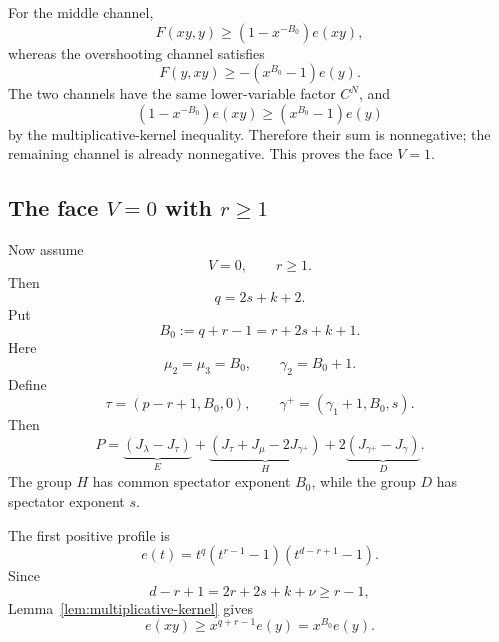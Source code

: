 \documentclass[11pt]{article}
\theoremstyle{definition}
\begin{document}
For the middle channel,
\begin{equation*}
F(xy,y)
\ge
(1-x^{-B_0})e(xy),
\end{equation*}
whereas the overshooting channel satisfies
\begin{equation*}
F(y,xy)
\ge
-(x^{B_0}-1)e(y).
\end{equation*}
The two channels have the same lower-variable factor \(C^N\), and
\begin{equation*}
(1-x^{-B_0})e(xy)
\ge
(x^{B_0}-1)e(y)
\end{equation*}
by the multiplicative-kernel inequality.  Therefore their sum is nonnegative; the remaining channel is already nonnegative.  This proves the face \(V=1\).

\subsection{The face \texorpdfstring{\(V=0\)}{V = 0} with \texorpdfstring{\(r\ge1\)}{r >= 1}}

Now assume
\begin{equation*}
V=0,
\qquad
r\ge1.
\end{equation*}
Then
\begin{equation*}
q=2s+k+2.
\end{equation*}
Put
\begin{equation*}
B_0:=q+r-1=r+2s+k+1.
\end{equation*}
Here
\begin{equation*}
\mu_2=\mu_3=B_0,
\qquad
\gamma_2=B_0+1.
\end{equation*}
Define
\begin{equation*}
\tau=(p-r+1,B_0,0),
\qquad
\gamma^+=(\gamma_1+1,B_0,s).
\end{equation*}
Then
\begin{equation*}
P
=
\underbrace{(J_\lambda-J_\tau)}_{E}
+
\underbrace{(J_\tau+J_\mu-2J_{\gamma^+})}_{H}
+
2\underbrace{(J_{\gamma^+}-J_\gamma)}_{D}.
\end{equation*}
The group \(H\) has common spectator exponent \(B_0\), while the group \(D\) has spectator exponent \(s\).

The first positive profile is
\begin{equation*}
e(t)
=
t^q(t^{r-1}-1)(t^{d-r+1}-1).
\end{equation*}
Since
\begin{equation*}
d-r+1=2r+2s+k+\nu\ge r-1,
\end{equation*}
Lemma~\ref{lem:multiplicative-kernel} gives
\begin{equation*}
e(xy)\ge x^{q+r-1}e(y)=x^{B_0}e(y).
\end{equation*}
\end{document}

